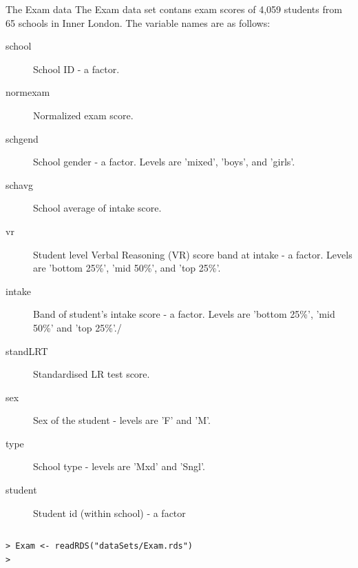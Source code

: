 \documentclass[table,smaller]{beamer}
\begin{document}
\begin{frame}[fragile,label=sec-5-2]{The Exam data}
 The Exam data set contans exam scores of 4,059 students from 65 schools in Inner London. The variable names are as follows:

\begin{description}
\item[{school}] School ID - a factor.
\item[{normexam}] Normalized exam score.
\item[{schgend}] School gender - a factor.  Levels are 'mixed', 'boys', and 'girls'.
\item[{schavg}] School average of intake score.
\item[{vr}] Student level Verbal Reasoning (VR) score band at intake - a factor.  Levels are 'bottom 25\%', 'mid 50\%', and 'top 25\%'.
\item[{intake}] Band of student's intake score - a factor.  Levels are 'bottom 25\%', 'mid 50\%' and 'top 25\%'./
\item[{standLRT}] Standardised LR test score.
\item[{sex}] Sex of the student - levels are 'F' and 'M'.
\item[{type}] School type - levels are 'Mxd' and 'Sngl'.
\item[{student}] Student id (within school) - a factor
\end{description}

\vspace{-.5em}
\begin{columns}
\begin{block}{}
\begin{verbatim}
> Exam <- readRDS("dataSets/Exam.rds")
>
\end{verbatim}
\end{block}
\end{columns}
\vspace{.5em}
\end{frame}
\end{document}
